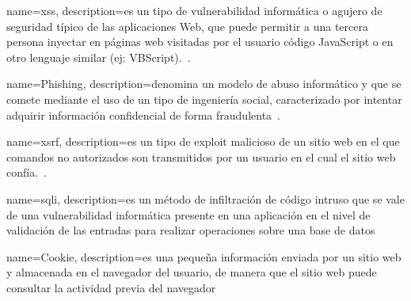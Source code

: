 {
    name=\acrlong{xss},
    description={es un tipo de vulnerabilidad informática o agujero de seguridad típico de las aplicaciones Web, que puede permitir a una tercera persona inyectar en páginas web visitadas por el usuario código JavaScript o
    en otro lenguaje similar (ej: VBScript).~\cite[Wikipedia]{wiki:xss}}.
}

{
    name=Phishing,
    description={denomina un modelo de abuso informático y que se comete mediante el uso de un tipo de ingeniería social, caracterizado por intentar adquirir información confidencial de forma
    fraudulenta~\cite[Wikipedia]{wiki:Phishing}}.
}

{
    name=\acrlong{xsrf},
    description={es un tipo de exploit malicioso de un sitio web en el que comandos no autorizados son transmitidos por un usuario en el cual el sitio web confía.~\cite[Wikipedia]{wiki:XSRF}}.
}

{
    name=\acrlong{sqli},
    description={es un método de infiltración de código intruso que se vale de una vulnerabilidad informática presente en una aplicación en el nivel de validación de las entradas para realizar operaciones sobre una base de
    datos~\cite[Wikipedia]{wiki:sqli}}
}

{
    name=\acrlong{Cookie},
    description={es una pequeña información enviada por un sitio web y almacenada en el navegador del usuario, de manera que el sitio web puede consultar la actividad previa del navegador~\cite[Wikipedia]{wiki:cookie}}
}

